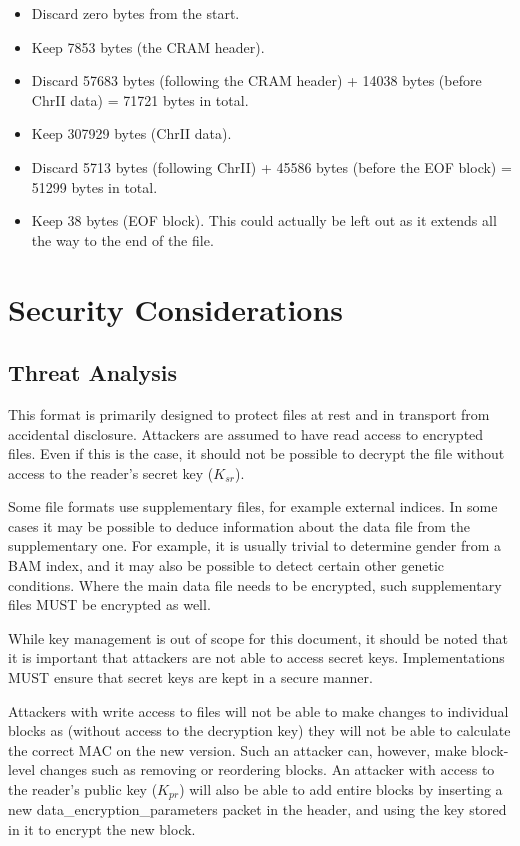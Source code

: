 \documentclass[10pt]{article}
\begin{document}
\begin{itemize}
\item Discard zero bytes from the start.
\item Keep 7853 bytes (the CRAM header).
\item Discard 57683 bytes (following the CRAM header) + 14038 bytes (before ChrII data) = 71721 bytes in total.
\item Keep 307929 bytes (ChrII data).
\item Discard 5713 bytes (following ChrII) + 45586 bytes (before the EOF block) = 51299 bytes in total.
\item Keep 38 bytes (EOF block).
This could actually be left out as it extends all the way to the end of the file.
\end{itemize}

\section{Security Considerations}
\subsection{Threat Analysis}
This format is primarily designed to protect files at rest and in transport from accidental disclosure.
Attackers are assumed to have read access to encrypted files.
Even if this is the case,
it should not be possible to decrypt the file without access to the reader's secret key ($K_{sr}$).

Some file formats use supplementary files, for example external indices.
In some cases it may be possible to deduce information about the data file from the supplementary one.
For example, it is usually trivial to determine gender from a BAM index,
and it may also be possible to detect certain other genetic conditions.
Where the main data file needs to be encrypted, such supplementary files MUST be encrypted as well.

While key management is out of scope for this document,
it should be noted that it is important that attackers are not able to access secret keys.
Implementations MUST ensure that secret keys are kept in a secure manner.

Attackers with write access to files will not be able to make changes to individual blocks as
(without access to the decryption key) they will not be able to calculate the correct MAC on the new version.
Such an attacker can, however, make block-level changes such as removing or reordering blocks.
An attacker with access to the reader's public key ($K_{pr}$) will also be able to add entire blocks by inserting a new
data\_encryption\_parameters packet in the header, and using the key stored in it to encrypt the new block.
\end{document}

